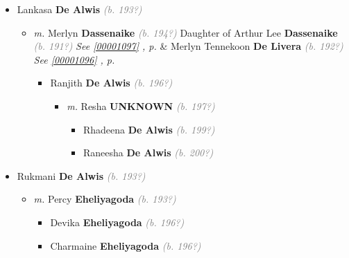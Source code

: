 \documentclass[10pt, openany]{book}
\begin{document}
\begin{itemize}
{\begin{itemize}
{\begin{itemize}
{\begin{itemize}
{\begin{itemize}
{\begin{itemize}
{\begin{itemize}
{\begin{itemize}
\item{Amal \textbf{Jayawardena} \textcolor{gray}{\textit{(b. 195?)}}
 }
\end{itemize}}
\end{itemize}
  }
\item{Lankasa \textbf{De Alwis} \textcolor{gray}{\textit{(b. 193?)}}
\begin{itemize}
\item{\textit{m.} Merlyn  \textbf{Dassenaike} \textcolor{gray}{\textit{(b. 194?)}} Daughter of  Arthur Lee \textbf{Dassenaike} \textcolor{gray}{\textit{(b. 191?)}} \textcolor{slteal}{\textit{See  \autoref{00001097} \textit{, p. \pageref{00001097} }}}  \&  Merlyn Tennekoon \textbf{De Livera} \textcolor{gray}{\textit{(b. 192?)}} \textcolor{slteal}{\textit{See  \autoref{00001096} \textit{, p. \pageref{00001096} }}}   \label{couple:00001104:00001105} \begin{itemize}
\item{Ranjith \textbf{De Alwis} \textcolor{gray}{\textit{(b. 196?)}}
\begin{itemize}
\item{\textit{m.} Resha \textbf{UNKNOWN} \textcolor{gray}{\textit{(b. 197?)}}   \label{couple:00001106:00001107} \begin{itemize}
\item{Rhadeena \textbf{De Alwis} \textcolor{gray}{\textit{(b. 199?)}}
  }
\item{Raneesha \textbf{De Alwis} \textcolor{gray}{\textit{(b. 200?)}}
  }
\end{itemize}}
\end{itemize}
  }
\end{itemize}}
\end{itemize}
  }
\item{Rukmani  \textbf{De Alwis} \textcolor{gray}{\textit{(b. 193?)}}
\begin{itemize}
\item{\textit{m.} Percy \textbf{Eheliyagoda} \textcolor{gray}{\textit{(b. 193?)}}   \label{couple:00001550:00001551} \begin{itemize}
\item{Devika \textbf{Eheliyagoda} \textcolor{gray}{\textit{(b. 196?)}}
 }
\item{Charmaine \textbf{Eheliyagoda} \textcolor{gray}{\textit{(b. 196?)}}
}
\end{itemize}}
\end{itemize}}
\end{itemize}}
\end{itemize}}
\end{itemize}}
\end{itemize}}
\end{itemize}}
\end{itemize}
\end{document}
